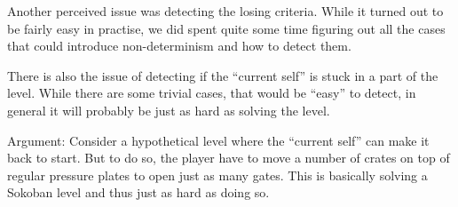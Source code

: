 Another perceived issue was detecting the losing criteria.  While it
turned out to be fairly easy in practise, we did spent quite some time
figuring out all the cases that could introduce non-determinism and
how to detect them.

There is also the issue of detecting if the ``current self'' is
stuck in a part of the level.  While there are some trivial cases,
that would be ``easy'' to detect, in general it will probably be
just as hard as solving the level.

Argument: Consider a hypothetical level where the ``current self'' can
make it back to start.  But to do so, the player have to move a number
of crates on top of regular pressure plates to open just as many
gates.  This is basically solving a Sokoban level and thus just as
hard as doing so.

